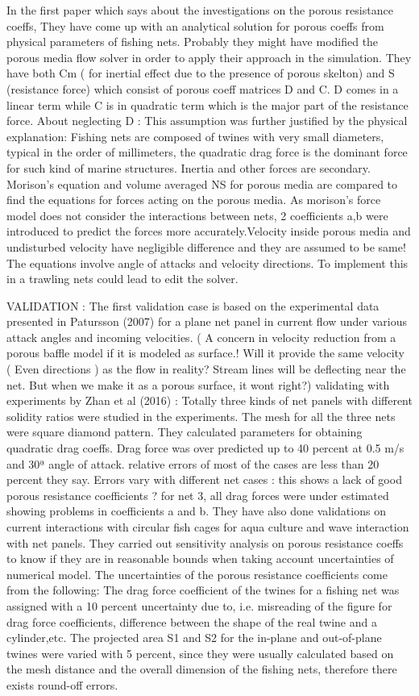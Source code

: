 \documentclass[letterpaper,12pt]{article}
\begin{document}
In the first paper which says about the investigations on the porous resistance coeffs, They have come up with an analytical solution for porous coeffs from physical parameters of fishing nets. Probably they might have modified the porous media flow solver in order to apply their approach in the simulation.  They have both Cm ( for inertial effect due to the presence of porous skelton) and S (resistance force) which consist of porous coeff matrices D and C. D comes in a linear term while C is in quadratic term which is the major part of the resistance force.
About neglecting D : This assumption was further justified by the physical explanation: Fishing nets are composed of twines with very small diameters, typical in the order of millimeters, the quadratic drag force is the dominant force for such kind of marine structures. Inertia and other forces are secondary.
Morison's equation and volume averaged NS for porous media are compared to find the equations for forces acting on the porous media. As morison's force model does not consider the interactions between nets, 2 coefficients a,b were introduced to predict the forces more accurately.Velocity inside porous media and undisturbed velocity have negligible difference and they are assumed to be same!
The equations involve angle of attacks and velocity directions. To implement this in a trawling nets could lead to edit the solver.

VALIDATION : The first validation case is based on the experimental data presented in Patursson (2007) for a plane net panel in current
flow under various attack angles and incoming velocities. ( A concern in velocity reduction from a porous baffle model if it is modeled as surface.! Will it provide the same velocity ( Even directions ) as the flow in reality? Stream lines will be deflecting near the net. But when we  make it as a porous surface, it wont right?)
validating with experiments by Zhan et al (2016) : Totally three kinds of net panels with different solidity ratios were studied in the experiments. The mesh for all the three nets were square diamond pattern. They calculated parameters for obtaining quadratic drag coeffs. Drag force was over predicted up to 40 percent  at 0.5 m/s and 30ª angle of attack. relative errors of most of the cases are less than 20 percent they say.
 Errors vary with different net cases : this shows a lack of good porous resistance coefficients ? for net 3, all drag forces were under estimated showing problems in coefficients a and b.
They have also done validations on current interactions with circular fish cages for aqua culture and wave
interaction with net panels.
They carried out sensitivity analysis on porous resistance coeffs to know if they are in reasonable bounds when taking account uncertainties of numerical model. The uncertainties of the porous resistance coefficients come from the following: The drag force coefficient of the twines for a fishing net was assigned with a 10 percent uncertainty due to, i.e. misreading of the figure for drag force coefficients, difference between the shape of the real twine and a cylinder,etc. The projected area S1 and S2 for the in-plane and out-of-plane twines were varied with 5 percent, since they were usually calculated based on the mesh distance and the overall dimension of the fishing nets, therefore there exists round-off errors.
\end{document}
